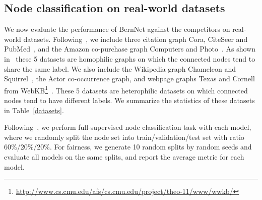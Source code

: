 \documentclass{article}
\begin{document}
\subsection{Node classification on real-world datasets}
\label{5.2}
We now evaluate the performance of BernNet  against the competitors on real-world datasets. Following~\cite{chien2021GPR-GNN}, we include three citation graph Cora, CiteSeer and PubMed~\cite{sen2008collective,yang2016revisiting}, and the Amazon co-purchase graph Computers and Photo~\cite{mcauley2015image}. As shown in~\cite{chien2021GPR-GNN} these 5 datasets are homophilic graphs on which the connected nodes tend to share the same label. We also include the Wikipedia graph Chameleon and Squirrel~\cite{musae}, the Actor co-occurrence graph, and webpage graphs Texas and Cornell from WebKB\footnote[3]{\url{http://www.cs.cmu.edu/afs/cs.cmu.edu/project/theo-11/www/wwkb/}}~\cite{pei2020geom}. These 5 datasets are heterophilic datasets on which connected nodes tend to have different labels.
We summarize the statistics of these datasets in Table~\ref{datasets}.



\begin{table}[t]
\centering
\caption{Dataset statistics.}
\label{datasets}
\end{table}

Following~\cite{chien2021GPR-GNN}, we perform full-supervised node classification task with each model, where we randomly split the node set into train/validation/test set with ratio 60\%/20\%/20\%. For fairness, we generate 10 random splits by random seeds and evaluate all models on the same splits, and report the average metric for each model. 
\end{document}

